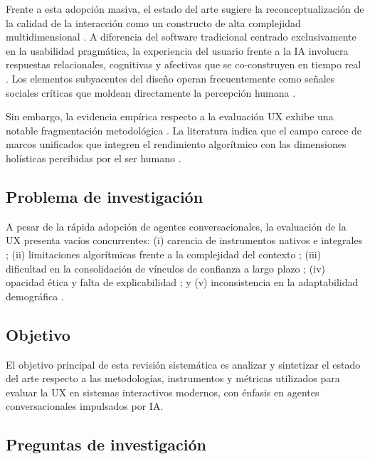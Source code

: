 \documentclass[11pt,twocolumn]{article}
\begin{document}
Frente a esta adopción masiva, el estado del arte sugiere la reconceptualización de la calidad de la interacción como un constructo de alta complejidad multidimensional \cite{marconi2026}. A diferencia del software tradicional centrado exclusivamente en la usabilidad pragmática, la experiencia del usuario frente a la IA involucra respuestas relacionales, cognitivas y afectivas que se co-construyen en tiempo real \cite{borsci2021}. Los elementos subyacentes del diseño operan frecuentemente como señales sociales críticas que moldean directamente la percepción humana \cite{wang2025}.

Sin embargo, la evidencia empírica respecto a la evaluación UX exhibe una notable fragmentación metodológica \cite{folstad2021}. La literatura indica que el campo carece de marcos unificados que integren el rendimiento algorítmico con las dimensiones holísticas percibidas por el ser humano \cite{marconi2026}.

\subsection{Problema de investigación}

A pesar de la rápida adopción de agentes conversacionales, la evaluación de la UX presenta vacíos concurrentes: (i) carencia de instrumentos nativos e integrales \cite{borsci2021, borsci2022}; (ii) limitaciones algorítmicas frente a la complejidad del contexto \cite{folstad2021}; (iii) dificultad en la consolidación de vínculos de confianza a largo plazo \cite{he2022}; (iv) opacidad ética y falta de explicabilidad \cite{jannach2022}; y (v) inconsistencia en la adaptabilidad demográfica \cite{wang2025}.

\subsection{Objetivo}

El objetivo principal de esta revisión sistemática es analizar y sintetizar el estado del arte respecto a las metodologías, instrumentos y métricas utilizados para evaluar la UX en sistemas interactivos modernos, con énfasis en agentes conversacionales impulsados por IA.

\subsection{Preguntas de investigación}
\end{document}
